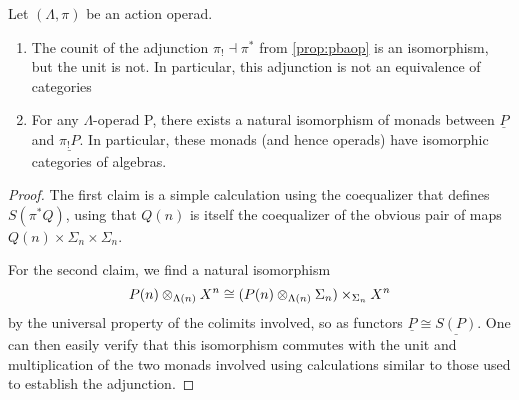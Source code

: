 \begin{thm}\label{thm_sym}
Let $(\Lambda, \pi)$ be an action operad.
\begin{enumerate}
\item The counit of the adjunction $\pi_{!} \dashv \pi^*$ from \cref{prop:pbaop} is an isomorphism, but the unit is not. In particular, this adjunction is not an equivalence of categories
\item For any $\Lambda$-operad P, there exists a natural isomorphism of monads between $\underline{P}$ and $\underline{\pi_{!}P}$. In particular, these monads (and hence operads) have isomorphic categories of algebras.
\end{enumerate}
\end{thm}
\begin{proof}
The first claim is a simple calculation using the coequalizer that defines $S(\pi^{*}Q)$, using that $Q(n)$ is itself the coequalizer of the obvious pair of maps $Q(n) \times \Sigma_{n} \times \Sigma_{n}$.

For the second claim, we find a natural isomorphism
  \[
    P(n) \otimes_{\Lambda(n)} X^{n} \cong (P(n) \otimes_{\Lambda(n)} \Sigma_{n}) \times_{\Sigma_{n}} X^{n}
  \]
by the universal property of the colimits involved, so as functors $\underline{P} \cong \underline{S(P)}$. One can then easily verify that this isomorphism commutes with the unit and multiplication of the two monads involved using calculations similar to those used to establish the adjunction.
\end{proof}

%

